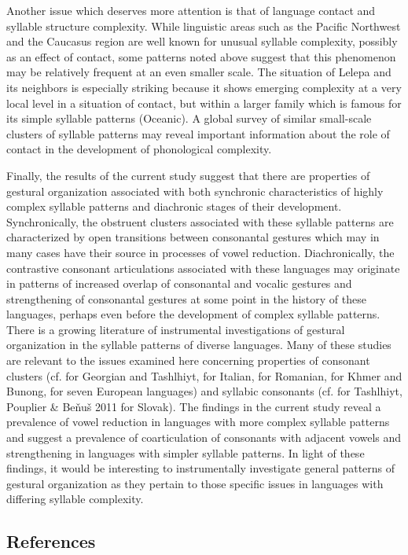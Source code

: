   Another issue which deserves more attention is that of language contact and syllable structure complexity. While linguistic areas such as the Pacific Northwest and the Caucasus region are well known for unusual syllable complexity, possibly as an effect of contact, some patterns noted above suggest that this phenomenon may be relatively frequent at an even smaller scale. The situation of Lelepa and its neighbors is especially striking because it shows emerging complexity at a very local level in a situation of contact, but within a larger family which is famous for its simple syllable patterns (Oceanic). A global survey of similar small-scale clusters of syllable patterns may reveal important information about the role of contact in the development of phonological complexity.

  Finally, the results of the current study suggest that there are properties of gestural organization associated with both synchronic characteristics of highly complex syllable patterns and diachronic stages of their development. Synchronically, the obstruent clusters associated with these syllable patterns are characterized by open transitions between consonantal gestures which may in many cases have their source in processes of vowel reduction. Diachronically, the contrastive consonant articulations associated with these languages may originate in patterns of increased overlap of consonantal and vocalic gestures and strengthening of consonantal gestures at some point in the history of these languages, perhaps even before the development of complex syllable patterns. There is a growing literature of instrumental investigations of gestural organization in the syllable patterns of diverse languages. Many of these studies are relevant to the issues examined here concerning properties of consonant clusters (cf. \citealt{GoldsteinEtAl2007} for Georgian and Tashlhiyt, \citealt{HermesEtAl2013} for Italian, \citealt{Marin2014} for Romanian, \citealt{Butler2015} for Khmer and Bunong, \citealt{MarinEtAl2017} for seven European languages) and syllabic consonants (cf. \citealt{HermesEtAl2011} for Tashlhiyt, Pouplier \& Beňuš 2011 for Slovak). The findings in the current study reveal a prevalence of vowel reduction in languages with more complex syllable patterns and suggest a prevalence of coarticulation of consonants with adjacent vowels and strengthening in languages with simpler syllable patterns. In light of these findings, it would be interesting to instrumentally investigate general patterns of gestural organization as they pertain to those specific issues in languages with differing syllable complexity.

\subsection{References}
\begin{verbatim}

 
\end{verbatim}

